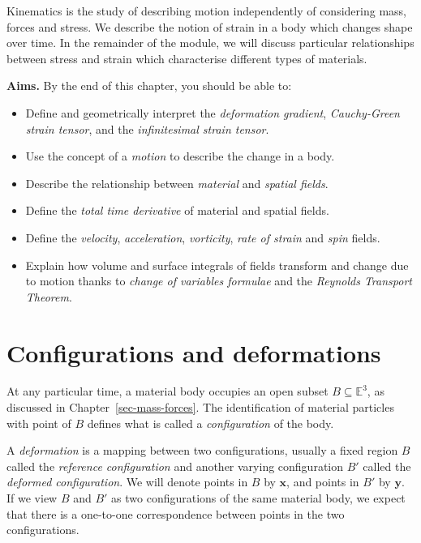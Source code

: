 \documentclass[
  letterpaper,
  DIV=11,
  numbers=noendperiod]{scrreprt}
\theoremstyle{plain}
\theoremstyle{remark}
\begin{document}
Kinematics is the study of describing motion independently of
considering mass, forces and stress. We describe the notion of strain in
a body which changes shape over time. In the remainder of the module, we
will discuss particular relationships between stress and strain which
characterise different types of materials.

\textbf{Aims.} By the end of this chapter, you should be able to:

\begin{itemize}
\item
  Define and geometrically interpret the \emph{deformation gradient},
  \emph{Cauchy-Green strain tensor}, and the \emph{infinitesimal strain
  tensor}.
\item
  Use the concept of a \emph{motion} to describe the change in a body.
\item
  Describe the relationship between \emph{material} and \emph{spatial
  fields}.
\item
  Define the \emph{total time derivative} of material and spatial
  fields.
\item
  Define the \emph{velocity}, \emph{acceleration}, \emph{vorticity},
  \emph{rate of strain} and \emph{spin} fields.
\item
  Explain how volume and surface integrals of fields transform and
  change due to motion thanks to \emph{change of variables formulae} and
  the \emph{Reynolds Transport Theorem}.
\end{itemize}

\section{Configurations and
deformations}\label{configurations-and-deformations}

At any particular time, a material body occupies an open subset
\(B\subseteq{\mathbb{E}}^3\), as discussed in
Chapter~\ref{sec-mass-forces}. The identification of material particles
with point of \(B\) defines what is called a \emph{configuration} of the
body.

A \emph{deformation} is a mapping between two configurations, usually a
fixed region \(B\) called the \emph{reference configuration} and another
varying configuration \(B'\) called the \emph{deformed configuration}.
We will denote points in \(B\) by \({\boldsymbol{x}}\), and points in
\(B'\) by \({\boldsymbol{y}}\). If we view \(B\) and \(B'\) as two
configurations of the same material body, we expect that there is a
one-to-one correspondence between points in the two configurations.
\end{document}
